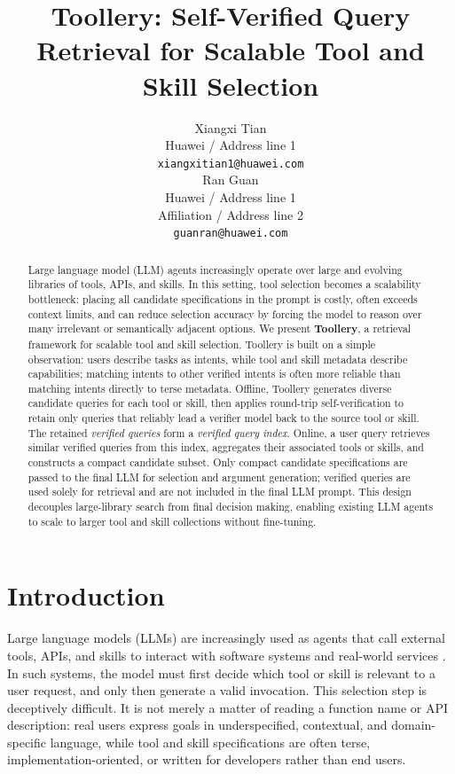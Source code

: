 \documentclass[11pt]{article}
\title{Toollery: Self-Verified Query Retrieval for Scalable Tool and Skill Selection}
\author{Xiangxi Tian \\
  Huawei / Address line 1 \\
  \texttt{xiangxitian1@huawei.com} \\\And
  Ran Guan \\
  Huawei / Address line 1 \\
  Affiliation / Address line 2 \\
  \texttt{guanran@huawei.com} \\}
\begin{document}
\maketitle
\begin{abstract}
Large language model (LLM) agents increasingly operate over large and evolving libraries of tools, APIs, and skills. In this setting, tool selection becomes a scalability bottleneck: placing all candidate specifications in the prompt is costly, often exceeds context limits, and can reduce selection accuracy by forcing the model to reason over many irrelevant or semantically adjacent options. We present \textbf{Toollery}, a retrieval framework for scalable tool and skill selection. Toollery is built on a simple observation: users describe tasks as intents, while tool and skill metadata describe capabilities; matching intents to other verified intents is often more reliable than matching intents directly to terse metadata. Offline, Toollery generates diverse candidate queries for each tool or skill, then applies round-trip self-verification to retain only queries that reliably lead a verifier model back to the source tool or skill. The retained \emph{verified queries} form a \emph{verified query index}. Online, a user query retrieves similar verified queries from this index, aggregates their associated tools or skills, and constructs a compact candidate subset. Only compact candidate specifications are passed to the final LLM for selection and argument generation; verified queries are used solely for retrieval and are not included in the final LLM prompt. This design decouples large-library search from final decision making, enabling existing LLM agents to scale to larger tool and skill collections without fine-tuning.
\end{abstract}
\section{Introduction}
\label{sec:intro}

Large language models (LLMs) are increasingly used as agents that call external tools, APIs, and skills to interact with software systems and real-world services \citep{schick2023toolformer, qin2023toolllm, patil2024gorilla, yao2022webshop}. In such systems, the model must first decide which tool or skill is relevant to a user request, and only then generate a valid invocation. This selection step is deceptively difficult. It is not merely a matter of reading a function name or API description: real users express goals in underspecified, contextual, and domain-specific language, while tool and skill specifications are often terse, implementation-oriented, or written for developers rather than end users.
\end{document}
